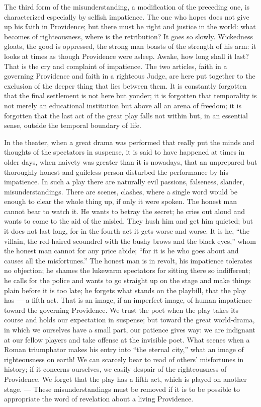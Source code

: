 \documentclass[12pt,a4paper,openany]{book}
\newcommand{\opage}[1]{\marginnote{\footnotesize\textit{[#1]}}}
\begin{document}
The third form of the misunderstanding, a modification of the preceding one, is characterized especially by selfish
impatience. The one who hopes does not give up his faith in Providence; but there must be right and justice in the
world: what becomes of righteousness, where is the retribution? It goes so slowly. Wickedness gloats, the good is
oppressed, the strong man boasts of the strength of his arm: it looks at times as though Providence were asleep.
Awake, how long shall it last? That is the cry and complaint of impatience. The two articles, faith in a governing
Providence and faith in a righteous Judge, are here put together to the exclusion of the deeper thing that lies
between them. It is constantly forgotten that the final settlement is not here but yonder; it is forgotten that
temporality is not merely an educational institution but above all an arena of freedom; it is
\setcounter{footnote}{0}%
\opage{60}forgotten that the last act of the great play falls not within but, in an essential sense, outside the
temporal boundary of life.

In the theater, when a great drama was performed that really put the minds and thoughts of the spectators in
suspense, it is said to have happened at times in older days, when naivety was greater than it is nowadays, that an
unprepared but thoroughly honest and guileless person disturbed the performance by his impatience. In such a play
there are naturally evil passions, falseness, slander, misunderstandings. There are scenes, clashes, where a single
word would be enough to clear the whole thing up, if only it were spoken. The honest man cannot bear to watch it. He
wants to betray the secret; he cries out aloud and wants to come to the aid of the misled. They hush him and get him
quieted; but it does not last long, for in the fourth act it gets worse and worse. It is he, ``the villain, the
red-haired scoundrel with the bushy brows and the black eyes,'' whom the honest man cannot for any price abide; ``for
it is he who goes about and causes all the misfortunes.'' The honest man is in revolt, his impatience tolerates no
objection; he shames the lukewarm spectators for sitting there so indifferent; he calls for the police and wants to go
straight up on the stage and make things plain before it is too late; he forgets what stands on the playbill, that the
play has --- a fifth act. That is an image, if an imperfect image, of human impatience toward the governing
Providence. We trust the poet when the play takes its course and holds our expectation in suspense; but toward the
great world-drama,
\setcounter{footnote}{0}%
\opage{61}in which we ourselves have a small part, our patience gives way: we are indignant at our fellow players and
take offense at the invisible poet. What scenes when a Roman triumphator makes his entry into ``the eternal city,''
what an image of righteousness on earth! We can scarcely bear to read of others' misfortunes in history; if it
concerns ourselves, we easily despair of the righteousness of Providence. We forget that the play has a fifth act,
which is played on another stage. --- These misunderstandings must be removed if it is to be possible to appropriate
the word of revelation about a living Providence.
\end{document}
